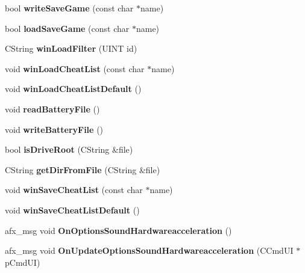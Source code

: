 \begin{DoxyCompactItemize}
bool {\bfseries write\+Save\+Game} (const char $\ast$name)
\item 
\mbox{\label{class_main_wnd_ae53f005e124fddf8681dc9a31992841f}} 
bool {\bfseries load\+Save\+Game} (const char $\ast$name)
\item 
\mbox{\label{class_main_wnd_a7adc4aa2a10246fa13637e9d0870843d}} 
C\+String {\bfseries win\+Load\+Filter} (U\+I\+NT id)
\item 
\mbox{\label{class_main_wnd_adfe445d042cd87dfa30b07fdcfa7eeff}} 
void {\bfseries win\+Load\+Cheat\+List} (const char $\ast$name)
\item 
\mbox{\label{class_main_wnd_a9d0fc611b92ef43d6a56c9f785051bee}} 
void {\bfseries win\+Load\+Cheat\+List\+Default} ()
\item 
\mbox{\label{class_main_wnd_a6f37e1bbcd8c635131b84ded2786578b}} 
void {\bfseries read\+Battery\+File} ()
\item 
\mbox{\label{class_main_wnd_a653d11c15657ad15c35073eaf892519c}} 
void {\bfseries write\+Battery\+File} ()
\item 
\mbox{\label{class_main_wnd_a3ee1d2026d24932c2ca0985c04fc8dd5}} 
bool {\bfseries is\+Drive\+Root} (C\+String \&file)
\item 
\mbox{\label{class_main_wnd_a55c4858ec2c3f621790c9c7aec67011e}} 
C\+String {\bfseries get\+Dir\+From\+File} (C\+String \&file)
\item 
\mbox{\label{class_main_wnd_ab71924a5be91bd6193c6ea19ddd3d483}} 
void {\bfseries win\+Save\+Cheat\+List} (const char $\ast$name)
\item 
\mbox{\label{class_main_wnd_afd3b77fc621f2b464369c472262689ab}} 
void {\bfseries win\+Save\+Cheat\+List\+Default} ()
\item 
\mbox{\label{class_main_wnd_a8adfcf00230b2bf44aa4a077bcdb6a0e}} 
afx\+\_\+msg void {\bfseries On\+Options\+Sound\+Hardwareacceleration} ()
\item 
\mbox{\label{class_main_wnd_aac8ad5e0c9a1a7051aea0f5327787f94}} 
afx\+\_\+msg void {\bfseries On\+Update\+Options\+Sound\+Hardwareacceleration} (C\+Cmd\+UI $\ast$p\+Cmd\+UI)
\end{DoxyCompactItemize}
